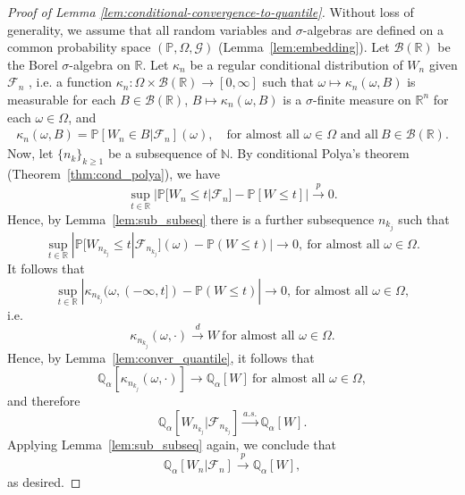 \documentclass[aos]{imsart}
\theoremstyle{definition}
\theoremstyle{remark}
\renewcommand{\P}{\mathbb{P}}							%
\newcommand{\Q}{\mathbb{Q}}								%
\newcommand{\R}{\mathbb{R}}								%
\newcommand{\convp}{\overset p \rightarrow}             %
\newcommand{\convd}{\overset d \rightarrow}             %
\newcommand{\convas}{\overset {a.s.} \rightarrow}       %
\begin{document}
	\begin{proof}[Proof of Lemma \ref{lem:conditional-convergence-to-quantile}]
		
		Without loss of generality, we assume that all random variables and $\sigma$-algebras are defined on a common probability space $(\P, \Omega, \mathcal G)$ (Lemma~\ref{lem:embedding}). Let $\mathcal B(\R)$ be the Borel $\sigma$-algebra on $\R$. Let $\kappa_{n}$ be a regular conditional distribution of $W_n$ given $\mathcal{F}_{n}$ \citep[Theorem 8.29]{Lista2017}, i.e. a function $\kappa_{n}: \Omega \times \mathcal B(\R) \rightarrow [0,\infty]$ such that $\omega \mapsto \kappa_{n}(\omega, B)$ is measurable for each $B \in \mathcal B(\R)$, $B \mapsto \kappa_{n}(\omega, B)$ is a $\sigma$-finite measure on $\R^n$ for each $\omega \in \Omega$, and 
		\begin{align*}
			\kappa_{n}(\omega, B) = \P[W_{n} \in B|\mathcal{F}_{n}](\omega), \quad \text{for almost all } \omega \in \Omega \text{ and all} \ B \in \mathcal B(\R).
		\end{align*}
		Now, let $\{n_k\}_{k \geq 1}$ be a subsequence of $\mathbb N$. By conditional Polya's theorem (Theorem~\ref{thm:cond_polya}), we have 
		\begin{equation}
			\sup_{t \in \R}|\P[W_{n}\leq t|\mathcal{F}_n]-\P[W\leq t]| \convp0.
		\end{equation}
		Hence, by Lemma~\ref{lem:sub_subseq} there is a further subsequence $n_{k_j}$ such that
		\begin{equation}
			\sup_{t \in \R}|\P[W_{n_{k_j}}\leq t|\mathcal{F}_{n_{k_j}}](\omega)-\P(W\leq t)|\rightarrow0,\ \text{for almost all } \omega \in \Omega.
		\end{equation}	
		It follows that 
		\begin{equation}
			\sup_{t \in \R}|\kappa_{n_{k_j}}(\omega, (-\infty, t])-\P(W\leq t)|\rightarrow0,\ \text{for almost all } \omega \in \Omega,
		\end{equation}
		i.e.
		\begin{equation}
			\kappa_{n_{k_j}}(\omega, \cdot) \convd W \ \text{for almost all } \omega \in \Omega.
		\end{equation}
		Hence, by Lemma~\ref{lem:conver_quantile}, it follows that
		\begin{equation}
			\Q_{\alpha}[\kappa_{n_{k_j}}(\omega, \cdot)] \rightarrow \Q_{\alpha}[W] \ \text{for almost all } \omega \in \Omega,
		\end{equation}
		and therefore
		\begin{equation}
			\Q_{\alpha}[W_{n_{k_j}}|\mathcal{F}_{n_{k_j}}] \convas \Q_{\alpha}[W].
		\end{equation}
		Applying Lemma~\ref{lem:sub_subseq} again, we conclude that
		\begin{equation}
			\Q_{\alpha}[W_{n}|\mathcal{F}_{n}] \convp \Q_{\alpha}[W],
		\end{equation}
		as desired.
	\end{proof}
\end{document}
